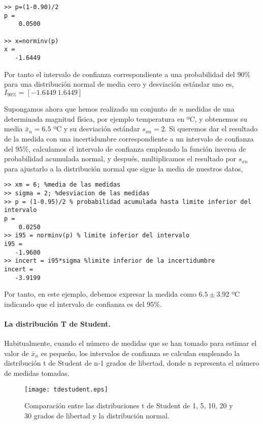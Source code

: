 \begin{verbatim}
>> p=(1-0.90)/2
p =
    0.0500

>> x=norminv(p)
x =
   -1.6449
\end{verbatim}

Por tanto el intervalo de confianza correspondiente a una probabilidad del $90\%$ para una distribución normal de media cero y desviación estándar uno es, $I_{90\%} =[-1.6449\ 1.6449]$

Supongamos ahora que hemos realizado un conjunto de $n$ medidas de una determinada magnitud física, por ejemplo temperatura en ºC, y obtenemos su media $\bar{x}_n=6.5$ ºC y su desviación estándar $s_{xn}=2$. Si queremos dar el resultado de la medida con una incertidumbre correspondiente a un intervalo de confianza del $95\%$, calculamos el intervalo de confianza empleando la función inversa de probabilidad acumulada normal, y después, multiplicamos el resultado por $s_{xn}$ para ajustarlo a la distribución normal que sigue la media de nuestros datos, 

\begin{verbatim}
>> xm = 6; %media de las medidas
>> sigma = 2; %desviacion de las medidas
>> p = (1-0.95)/2 % probabilidad acumulada hasta limite inferior del intervalo
p =
    0.0250
>> i95 = norminv(p) % limite inferior del intervalo
i95 =
   -1.9600 
>> incert = i95*sigma %limite inferior de la incertidumbre
incert =
   -3.9199
\end{verbatim}

Por tanto, en este ejemplo, debemos expresar la medida como $6.5 \pm 3.92$ ºC indicando que el intervalo de confianza es del $95\%$.

\paragraph{La distribución T de Student.} Habitualmente, cuando el número de medidas que se han tomado para estimar el valor de $\bar{x}_n$ es pequeño, los intervalos de confianza se calculan empleando la distribución t de Student de n-1 grados de libertad, donde  n representa el número de medidas tomadas.

\begin{figure}[h]
\centering
\texttt{[image: tdestudent.eps]}
\caption{Comparación entre las distribuciones t de Student de 1, 5, 10, 20 y 30 grados de libertad y la distribución normal.}
\label{fig:tdst}
\end{figure}

